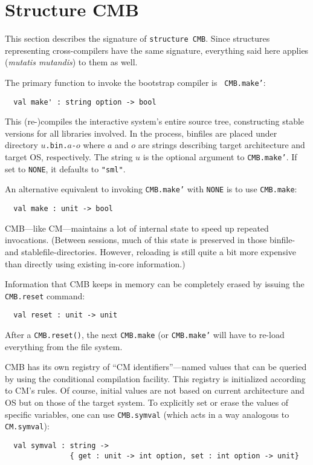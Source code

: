 
\section{Structure CMB}

This section describes the signature of {\tt structure CMB}.  Since
structures representing cross-compilers have the same signature,
everything said here applies ({\em mutatis mutandis}) to them as well.

The primary function to invoke the bootstrap compiler is {\tt
CMB.make'}:

\begin{verbatim}
  val make' : string option -> bool
\end{verbatim}

This (re-)compiles the interactive system's entire source tree,
constructing stable versions for all libraries involved.  In the
process, binfiles are placed under directory {\tt $u$.bin.$a$-$o$}
where $a$ and $o$ are strings describing target architecture and
target OS, respectively.  The string $u$ is the optional argument to
{\tt CMB.make'}.  If set to {\tt NONE}, it defaults to \verb|"sml"|.

An alternative equivalent to invoking {\tt CMB.make'} with {\tt NONE}
is to use {\tt CMB.make}:

\begin{verbatim}
  val make : unit -> bool
\end{verbatim}

CMB---like CM---maintains a lot of internal state to speed up repeated
invocations.  (Between sessions, much of this state is preserved in
those binfile- and stablefile-directories.  However, reloading is
still quite a bit more expensive than directly using existing in-core
information.)

Information that CMB keeps in memory can be completely erased by
issuing the {\tt CMB.reset} command:

\begin{verbatim}
  val reset : unit -> unit
\end{verbatim}

After a {\tt CMB.reset()}, the next {\tt CMB.make} (or {\tt CMB.make'}
will have to re-load everything from the file system.

CMB has its own registry of ``CM identifiers''---named values that can
be queried by using the conditional compilation facility.  This
registry is initialized according to CM's rules. Of course, initial
values are not based on current architecture and OS but on those of the
target system.  To explicitly set or erase the values of specific
variables, one can use {\tt CMB.symval} (which acts in a way analogous
to {\tt CM.symval}):

\begin{verbatim}
  val symval : string ->
               { get : unit -> int option, set : int option -> unit}
\end{verbatim}
